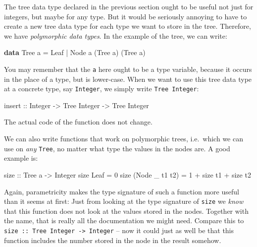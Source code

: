 \documentclass[11pt,
  american,
  DIV13]{article}
\newenvironment{Shaded}{}{}
\newcommand{\DataTypeTok}[1]{\textcolor[rgb]{0.56,0.13,0.00}{#1}}
\newcommand{\DecValTok}[1]{\textcolor[rgb]{0.25,0.63,0.44}{#1}}
\newcommand{\KeywordTok}[1]{\textcolor[rgb]{0.00,0.44,0.13}{\textbf{#1}}}
\newcommand{\NormalTok}[1]{#1}
\newcommand{\OperatorTok}[1]{\textcolor[rgb]{0.40,0.40,0.40}{#1}}
\newcommand{\OtherTok}[1]{\textcolor[rgb]{0.00,0.44,0.13}{#1}}
\begin{document}
The tree data type declared in the previous section ought to be useful
not just for integers, but maybe for any type. But it would be seriously
annoying to have to create a new tree data type for each type we want to
store in the tree. Therefore, we have \emph{polymorphic data types}. In
the example of the tree, we can write:

\begin{Shaded}
\begin{Highlighting}[]
\KeywordTok{data} \DataTypeTok{Tree}\NormalTok{ a }\OtherTok{=} \DataTypeTok{Leaf} \OperatorTok{|} \DataTypeTok{Node}\NormalTok{ a (}\DataTypeTok{Tree}\NormalTok{ a) (}\DataTypeTok{Tree}\NormalTok{ a)}
\end{Highlighting}
\end{Shaded}

You may remember that the \texttt{a} here ought to be a type variable,
because it occurs in the place of a type, but is lower-case. When we
want to use this tree data type at a concrete type, say
\texttt{Integer}, we simply write \texttt{Tree\ Integer}:

\begin{Shaded}
\begin{Highlighting}[]
\OtherTok{insert ::} \DataTypeTok{Integer} \OtherTok{{-}\textgreater{}} \DataTypeTok{Tree} \DataTypeTok{Integer} \OtherTok{{-}\textgreater{}} \DataTypeTok{Tree} \DataTypeTok{Integer}
\end{Highlighting}
\end{Shaded}

The actual code of the function does not change.

We can also write functions that work on polymorphic trees, i.e.~which
we can use on \emph{any} \texttt{Tree}, no matter what type the values
in the nodes are. A good example is:

\begin{Shaded}
\begin{Highlighting}[]
\OtherTok{size ::} \DataTypeTok{Tree}\NormalTok{ a }\OtherTok{{-}\textgreater{}} \DataTypeTok{Integer}
\NormalTok{size }\DataTypeTok{Leaf} \OtherTok{=} \DecValTok{0}
\NormalTok{size (}\DataTypeTok{Node}\NormalTok{ \_ t1 t2) }\OtherTok{=} \DecValTok{1} \OperatorTok{+}\NormalTok{ size t1 }\OperatorTok{+}\NormalTok{ size t2}
\end{Highlighting}
\end{Shaded}

Again, parametricity makes the type signature of such a function more
useful than it seems at first: Just from looking at the type signature
of \texttt{size} we \emph{know} that this function does not look at the
values stored in the nodes. Together with the name, that is really all
the documentation we might need. Compare this to
\texttt{size\ ::\ Tree\ Integer\ -\textgreater{}\ Integer} -- now it
could just as well be that this function includes the number stored in
the node in the result somehow.
\end{document}
